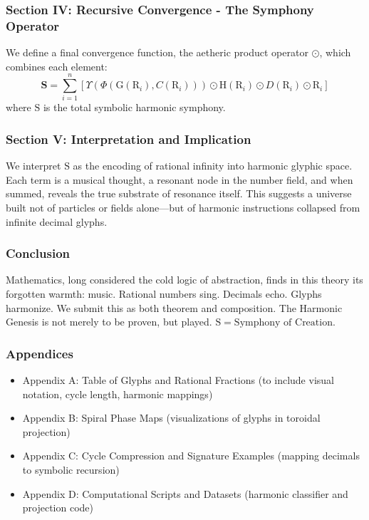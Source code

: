 \subsubsection{Section IV: Recursive Convergence - The Symphony Operator}
We define a final convergence function, the aetheric product operator \( \odot \), which combines each element:
\[
\mathbf{S} = \sum_{i=1}^n \left[ \Upsilon \left( \Phi \left( \mathrm{G}(\mathrm{R}_i), C(\mathrm{R}_i) \right) \right) \odot \mathrm{H}(\mathrm{R}_i) \odot D(\mathrm{R}_i) \odot \mathrm{R}_i \right]
\]
where \( \mathrm{S} \) is the total symbolic harmonic symphony.

\subsubsection{Section V: Interpretation and Implication}
We interpret \( \mathrm{S} \) as the encoding of rational infinity into harmonic glyphic space. Each term is a musical thought, a resonant node in the number field, and when summed, reveals the true substrate of resonance itself. This suggests a universe built not of particles or fields alone—but of harmonic instructions collapsed from infinite decimal glyphs.

\subsubsection{Conclusion}
Mathematics, long considered the cold logic of abstraction, finds in this theory its forgotten warmth: music. Rational numbers sing. Decimals echo. Glyphs harmonize. We submit this as both theorem and composition. The Harmonic Genesis is not merely to be proven, but played. \( \mathrm{S} = \text{Symphony of Creation} \).

\subsubsection{Appendices}
\begin{itemize}
    \item \texttt{} Appendix A: Table of Glyphs and Rational Fractions (to include visual notation, cycle length, harmonic mappings)
    \item \texttt{} Appendix B: Spiral Phase Maps (visualizations of glyphs in toroidal projection)
    \item \texttt{} Appendix C: Cycle Compression and Signature Examples (mapping decimals to symbolic recursion)
    \item \texttt{} Appendix D: Computational Scripts and Datasets (harmonic classifier and projection code)
\end{itemize}

